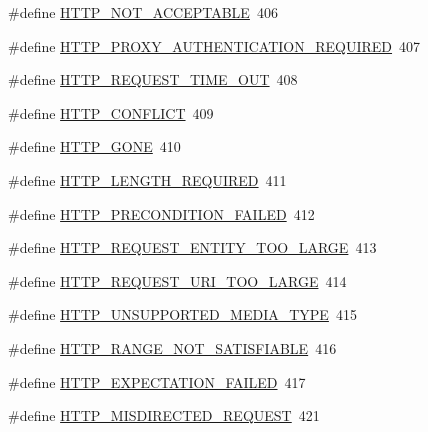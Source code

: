 \begin{DoxyCompactItemize}
\item 
\#define \hyperlink{group__HTTP__Status_gacb89221da09275b64daddfb415644055}{H\+T\+T\+P\+\_\+\+N\+O\+T\+\_\+\+A\+C\+C\+E\+P\+T\+A\+B\+LE}~406
\item 
\#define \hyperlink{group__HTTP__Status_ga23bec441a6233a1b687d48d31d45ea57}{H\+T\+T\+P\+\_\+\+P\+R\+O\+X\+Y\+\_\+\+A\+U\+T\+H\+E\+N\+T\+I\+C\+A\+T\+I\+O\+N\+\_\+\+R\+E\+Q\+U\+I\+R\+ED}~407
\item 
\#define \hyperlink{group__HTTP__Status_ga19f05d6acd556bd28c1ffdbb763cf9aa}{H\+T\+T\+P\+\_\+\+R\+E\+Q\+U\+E\+S\+T\+\_\+\+T\+I\+M\+E\+\_\+\+O\+UT}~408
\item 
\#define \hyperlink{group__HTTP__Status_gaec883057ad9f0c80b611818dc33bc990}{H\+T\+T\+P\+\_\+\+C\+O\+N\+F\+L\+I\+CT}~409
\item 
\#define \hyperlink{group__HTTP__Status_gab4af80c52cccc5b2c287fe12926b5dff}{H\+T\+T\+P\+\_\+\+G\+O\+NE}~410
\item 
\#define \hyperlink{group__HTTP__Status_ga19ee29b0b97ea2a09e35ac82f2d4bf73}{H\+T\+T\+P\+\_\+\+L\+E\+N\+G\+T\+H\+\_\+\+R\+E\+Q\+U\+I\+R\+ED}~411
\item 
\#define \hyperlink{group__HTTP__Status_ga2861af5b328c5c8209dbd3a7147e9727}{H\+T\+T\+P\+\_\+\+P\+R\+E\+C\+O\+N\+D\+I\+T\+I\+O\+N\+\_\+\+F\+A\+I\+L\+ED}~412
\item 
\#define \hyperlink{group__HTTP__Status_ga93fd8ea184f2b91b69c000f86d2e35bf}{H\+T\+T\+P\+\_\+\+R\+E\+Q\+U\+E\+S\+T\+\_\+\+E\+N\+T\+I\+T\+Y\+\_\+\+T\+O\+O\+\_\+\+L\+A\+R\+GE}~413
\item 
\#define \hyperlink{group__HTTP__Status_ga4a24fc2734c1665d39672a81ee2a45a6}{H\+T\+T\+P\+\_\+\+R\+E\+Q\+U\+E\+S\+T\+\_\+\+U\+R\+I\+\_\+\+T\+O\+O\+\_\+\+L\+A\+R\+GE}~414
\item 
\#define \hyperlink{group__HTTP__Status_ga303e1d879c760fa572f3d53358f6631b}{H\+T\+T\+P\+\_\+\+U\+N\+S\+U\+P\+P\+O\+R\+T\+E\+D\+\_\+\+M\+E\+D\+I\+A\+\_\+\+T\+Y\+PE}~415
\item 
\#define \hyperlink{group__HTTP__Status_ga271f06010928c15d0f79db5732756dd5}{H\+T\+T\+P\+\_\+\+R\+A\+N\+G\+E\+\_\+\+N\+O\+T\+\_\+\+S\+A\+T\+I\+S\+F\+I\+A\+B\+LE}~416
\item 
\#define \hyperlink{group__HTTP__Status_ga9419cf3e03b1b3e36c67335cb59edf57}{H\+T\+T\+P\+\_\+\+E\+X\+P\+E\+C\+T\+A\+T\+I\+O\+N\+\_\+\+F\+A\+I\+L\+ED}~417
\item 
\#define \hyperlink{group__HTTP__Status_gaea662a5deb151adef021ea72815be2df}{H\+T\+T\+P\+\_\+\+M\+I\+S\+D\+I\+R\+E\+C\+T\+E\+D\+\_\+\+R\+E\+Q\+U\+E\+ST}~421

\end{DoxyCompactItemize}
